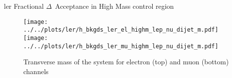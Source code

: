 \documentclass{article}
\begin{document}
\begin{table}[htbp]
  \centering
  \caption{ler Fractional $\Delta$~Acceptance in High Mass control region}
\end{table}


\begin{figure}[h]
  \centering
  \texttt{[image: ../../plots/ler/h\_bkgds\_ler\_el\_highm\_lep\_nu\_dijet\_m.pdf]}
  \texttt{[image: ../../plots/ler/h\_bkgds\_ler\_mu\_highm\_lep\_nu\_dijet\_m.pdf]}
  
  \caption{Transverse mass of the system for electron (top) and muon (bottom) channels}
\end{figure}
\end{document}

